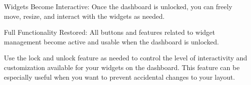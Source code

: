 Widgets Become Interactive: Once the dashboard is unlocked, you can freely move, resize, and interact with the widgets as needed.

Full Functionality Restored: All buttons and features related to widget management become active and usable when the dashboard is unlocked.

Use the lock and unlock feature as needed to control the level of interactivity and customization available for your widgets on the dashboard. This feature can be especially useful when you want to prevent accidental changes to your layout.